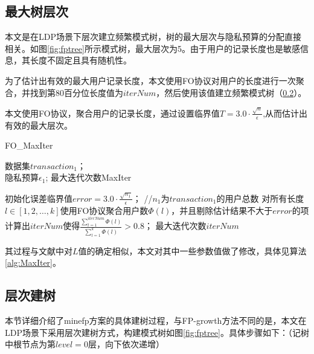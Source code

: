 \documentclass[UTF8]{ctexart}
\begin{document}






\subsection{最大树层次}
\label{section:MaxIter}
本文是在LDP场景下层次建立频繁模式树，树的最大层次与隐私预算的分配直接相关。如图\ref{fig:fptree}所示模式树，最大层次为5。由于用户的记录长度也是敏感信息，其长度不固定且具有随机性。

为了估计出有效的最大用户记录长度，本文使用FO协议对用户的长度进行一次聚合，并找到第80百分位长度值为$iterNum$，然后使用该值建立频繁模式树（\ref{section:buildTree}）。



本文使用FO协议，聚合用户的记录长度，通过设置临界值$T=3.0 \cdot \frac{\sqrt{n}}{\epsilon}$,从而估计出有效的最大层次。

\begin{algorithm}[!]
\caption{FO\_MaxIter}
\label{alg:MaxIter}
\begin{algorithmic}[1]
\REQUIRE 数据集$transaction_1$；\\
隐私预算$\epsilon_1$;
\ENSURE 最大迭代次数MaxIter

\STATE 初始化误差临界值$error = 3.0 \cdot \frac{\sqrt{n_1}}{\epsilon}$； //$n_1$为$transaction_1$的用户总数
\label{T threshold}
\STATE 对所有长度$l \in [1,2,\ldots,k]$使用FO协议聚合用户数$\Phi(l)$，并且剔除估计结果不大于$error$的项
\STATE 计算出$iterNum$使得$\frac{ \sum_{l=1}^{iterNum} \Phi(l)}{\sum_{l=1}^k \Phi(l)} > 0.8$；
\label{gamma=0.8}
\RETURN 最大迭代次数$iterNum$
\end{algorithmic}
\end{algorithm}

其过程与文献\cite{wang2018locally}中对$L$值的确定相似，本文对其中一些参数值做了修改，具体见算法\ref{alg:MaxIter}。

\newpage
\subsection{层次建树}
\label{section:buildTree}
  本节详细介绍了minefp方案的具体建树过程，与FP-growth方法不同的是，本文在LDP场景下采用层次建树方式，构建模式树如图\ref{fig:fptree}。具体步骤如下：（记树中根节点为第$level = 0$层，向下依次递增）
\end{document}
